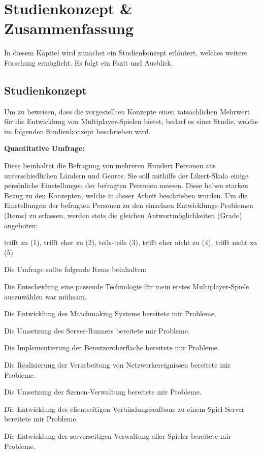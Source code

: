 \chapter{Studienkonzept \& Zusammenfassung }
\label{sec:zusammenfassung}

In diesem Kapitel wird zunächst ein Studienkonzept erläutert, welches weitere Forschung ermöglicht. Es folgt ein Fazit und Ausblick.

\section{Studienkonzept}
\label{studienkonzept}

Um zu beweisen, dass die vorgestellten Konzepte einen tatsächlichen Mehrwert für die Entwicklung von Multiplayer-Spielen bietet, bedarf es einer Studie, welche im folgenden Studienkonzept beschrieben wird.

\textbf{Quantitative Umfrage:}

Diese beinhaltet die Befragung von mehreren Hundert Personen aus unterschiedlichen Ländern und Genres. Sie soll mithilfe der Likert-Skala \cite{Wikipedia.2022d} einige persönliche Einstellungen der befragten Personen messen. Diese haben starken Bezug zu den Konzepten, welche in dieser Arbeit beschrieben wurden. Um die Einstellungen der befragten Personen zu den einzelnen Entwicklungs-Problemen (Items) zu erfassen, werden stets die gleichen Antwortmöglichkeiten (Grade) angeboten:

trifft zu (1), trifft eher zu (2), teils-teils (3), trifft eher nicht zu (4), trifft nicht zu (5)

Die Umfrage sollte folgende Items beinhalten:

Die Entscheidung eine passende Technologie für mein erstes Multiplayer-Spiele auszuwählen war mühsam.

Die Entwicklung des Matchmaking Systems bereitete mir Probleme.

Die Umsetzung des Server-Runners bereitete mir Probleme.

Die Implementierung der Benutzeroberfläche bereitete mir Probleme.

Die Realisierung der Verarbeitung von Netzwerkereignissen bereitete mir Probleme.

Die Umsetzung der Szenen-Verwaltung bereitete mir Probleme.

Die Entwicklung des clientseitigen Verbindungsaufbaus zu einem Spiel-Server bereitete mir Probleme.

Die Entwicklung der serverseitigen Verwaltung aller Spieler bereitete mir Probleme.

